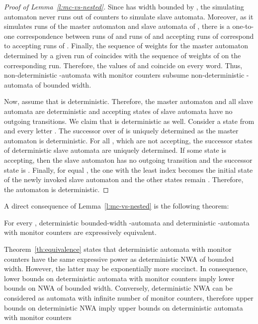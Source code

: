 \documentclass{lmcs}
\begin{document}
\begin{proof}[Proof of Lemma~\ref{l:mc-vs-nested}]
Since  has width bounded by , the simulating automaton  never runs out of counters to simulate slave automata.
Moreover, as it simulates runs of the master automaton and slave automata of , there is a one-to-one
correspondence between runs of  and runs of  and accepting runs of  correspond to accepting runs of .
Finally, the sequence of weights for the master automaton determined by a given run of  coincides with the sequence of
weights of  on the corresponding run. Therefore, the values of  and  coincide on every word.
Thus, non-deterministic -automata with monitor counters  subsume
non-deterministic -automata of bounded width.

Now, assume that  is deterministic. Therefore, the master automaton and all slave automata are deterministic and accepting states of slave automata have no outgoing transitions.
We claim that  is deterministic as well.
Consider a state  from  and every letter .
The successor over  of  is uniquely determined as the master automaton is deterministic.
For all , which are not accepting, the successor states of deterministic slave automata are uniquely determined.
If some state  is accepting, then the slave automaton has no outgoing transition and the successor state is .
Finally, for  equal , the one with the least index becomes the initial state of the newly invoked slave automaton and
the other states remain .
Therefore, the automaton  is deterministic.
\end{proof}

A direct consequence of Lemma~\ref{l:mc-vs-nested}  is the following theorem:

\begin{thm}\label{th:equivalence}
For every  , deterministic
bounded-width -automata and deterministic -automata with monitor counters are expressively equivalent.
\end{thm}

\begin{rem}[Discussion]
Theorem~\ref{th:equivalence}
 states that deterministic automata with monitor counters have
the same expressive power as deterministic NWA of bounded width. However, the latter may be exponentially more succinct.
In consequence, lower bounds on deterministic automata with monitor counters imply lower bounds on NWA of bounded width.
Conversely, deterministic NWA can be considered as automata with infinite number of monitor counters, therefore
upper bounds on deterministic NWA imply upper bounds on deterministic automata with monitor counters
\end{rem}
\end{document}
